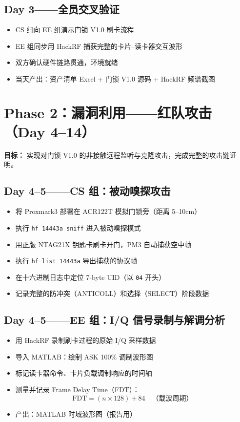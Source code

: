 \documentclass[12pt,a4paper]{ctexart}
\begin{document}
\subsection*{Day 3——全员交叉验证}
\begin{itemize}[nosep]
    \item CS 组向 EE 组演示门锁 V1.0 刷卡流程
    \item EE 组同步用 HackRF 捕获完整的卡片--读卡器交互波形
    \item 双方确认硬件链路贯通，环境就绪
    \item 当天产出：资产清单 Excel + 门锁 V1.0 源码 + HackRF 频谱截图
\end{itemize}

\section{Phase 2：漏洞利用——红队攻击（Day 4--14）}

\textbf{目标：} 实现对门锁 V1.0 的非接触远程监听与克隆攻击，完成完整的攻击链证明。

\subsection*{Day 4--5——CS 组：被动嗅探攻击}
\begin{itemize}[nosep]
    \item 将 Proxmark3 部署在 ACR122T 模拟门锁旁（距离 5--10cm）
    \item 执行 \texttt{hf 14443a sniff} 进入被动嗅探模式
    \item 用正版 NTAG21X 钥匙卡刷卡开门，PM3 自动捕获空中帧
    \item 执行 \texttt{hf list 14443a} 导出捕获的协议帧
    \item 在十六进制日志中定位 7-byte UID（以 \texttt{04} 开头）
    \item 记录完整的防冲突（ANTICOLL）和选择（SELECT）阶段数据
\end{itemize}

\subsection*{Day 4--5——EE 组：I/Q 信号录制与解调分析}
\begin{itemize}[nosep]
    \item 用 HackRF 录制刷卡过程的原始 I/Q 采样数据
    \item 导入 MATLAB：绘制 ASK 100\% 调制波形图
    \item 标记读卡器命令、卡片负载调制响应的时间轴
    \item 测量并记录 Frame Delay Time（FDT）：
    \[
    \text{FDT} = (n \times 128) + 84 \quad \text{（载波周期）}
    \]
    \item 产出：MATLAB 时域波形图（报告用）
\end{itemize}
\end{document}
